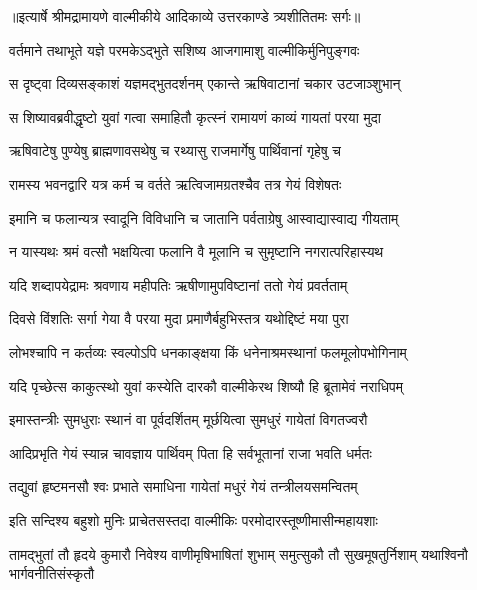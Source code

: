 {॥इत्यार्षे श्रीमद्रामायणे वाल्मीकीये आदिकाव्ये उत्तरकाण्डे त्र्यशीतितमः सर्गः॥}


\twolineshloka
{वर्तमाने तथाभूते यज्ञे परमकेऽद्भुते}
{सशिष्य आजगामाशु वाल्मीकिर्मुनिपुङ्गवः} %

\twolineshloka
{स दृष्ट्वा दिव्यसङ्काशं यज्ञमद्भुतदर्शनम्}
{एकान्ते ऋषिवाटानां चकार उटजाञ्शुभान्} %

\twolineshloka
{स शिष्यावब्रवीद्धृष्टो युवां गत्वा समाहितौ}
{कृत्स्नं रामायणं काव्यं गायतां परया मुदा} %

\twolineshloka
{ऋषिवाटेषु पुण्येषु ब्राह्मणावसथेषु च}
{रथ्यासु राजमार्गेषु पार्थिवानां गृहेषु च} %

\twolineshloka
{रामस्य भवनद्वारि यत्र कर्म च वर्तते}
{ऋत्विजामग्रतश्चैव तत्र गेयं विशेषतः} %

\twolineshloka
{इमानि च फलान्यत्र स्वादूनि विविधानि च}
{जातानि पर्वताग्रेषु आस्वाद्यास्वाद्य गीयताम्} %

\twolineshloka
{न यास्यथः श्रमं वत्सौ भक्षयित्वा फलानि वै}
{मूलानि च सुमृष्टानि नगरात्परिहास्यथ} %

\twolineshloka
{यदि शब्दापयेद्रामः श्रवणाय महीपतिः}
{ऋषीणामुपविष्टानां ततो गेयं प्रवर्तताम्} %

\twolineshloka
{दिवसे विंशतिः सर्गा गेया वै परया मुदा}
{प्रमाणैर्बहुभिस्तत्र यथोद्दिष्टं मया पुरा} %

\twolineshloka
{लोभश्चापि न कर्तव्यः स्वल्पोऽपि धनकाङ्क्षया}
{किं धनेनाश्रमस्थानां फलमूलोपभोगिनाम्} %

\twolineshloka
{यदि पृच्छेत्स काकुत्स्थो युवां कस्येति दारकौ}
{वाल्मीकेरथ शिष्यौ हि ब्रूतामेवं नराधिपम्} %

\twolineshloka
{इमास्तन्त्रीः सुमधुराः स्थानं वा पूर्वदर्शितम्}
{मूर्छयित्वा सुमधुरं गायेतां विगतज्वरौ} %

\twolineshloka
{आदिप्रभृति गेयं स्यान्न चावज्ञाय पार्थिवम्}
{पिता हि सर्वभूतानां राजा भवति धर्मतः} %

\twolineshloka
{तद्युवां हृष्टमनसौ श्वः प्रभाते समाधिना}
{गायेतां मधुरं गेयं तन्त्रीलयसमन्वितम्} %

\twolineshloka
{इति सन्दिश्य बहुशो मुनिः प्राचेतसस्तदा}
{वाल्मीकिः परमोदारस्तूष्णीमासीन्महायशाः} %

\fourlineindentedshloka
{तामद्भुतां तौ हृदये कुमारौ}
{निवेश्य वाणीमृषिभाषितां शुभाम्}
{समुत्सुकौ तौ सुखमूषतुर्निशाम्}
{यथाश्विनौ भार्गवनीतिसंस्कृतौ} %


